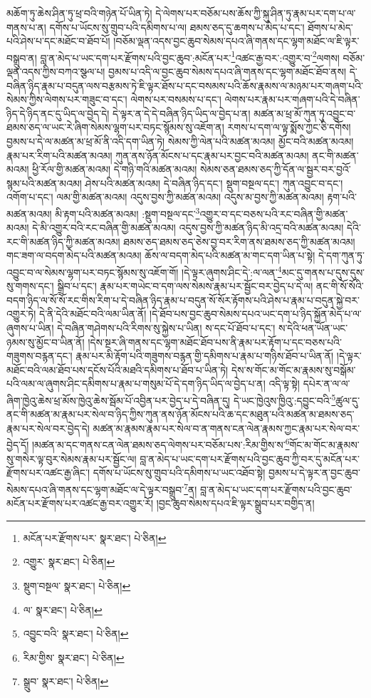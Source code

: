 མཆོག་ཏུ་ཆེས་ཤིན་ཏུ་ཕྲ་བའི་གཉེན་པོ་ཡིན་ཏེ། དེ་ལེགས་པར་བཅོམ་པས་ཆོས་ཀྱི་སྐུ་ཤིན་ཏུ་རྣམ་པར་དག་པ་ལ་གནས་པ་ན། དགོས་པ་ཡོངས་སུ་གྲུབ་པའི་དམིགས་པ་ལ། ཐམས་ཅད་དུ་ཆགས་པ་མེད་པ་དང་། ཐོགས་པ་མེད་པའི་ཤེས་པ་དང་མཐོང་བ་ཐོབ་པོ། །བཅོམ་ལྡན་འདས་བྱང་ཆུབ་སེམས་དཔའ་ཞི་གནས་དང་ལྷག་མཐོང་ལ་ཇི་ལྟར་བསྒྲུབ་ན། བླ་ན་མེད་པ་ཡང་དག་པར་རྫོགས་པའི་བྱང་ཆུབ་:མངོན་པར་\footnote{མངོན་པར་རྫོགས་པར་  སྣར་ཐང་།  པེ་ཅིན། }འཚང་རྒྱ་བར་:འགྱུར་བ་\footnote{འགྱུར་  སྣར་ཐང་།  པེ་ཅིན། }ལགས། བཅོམ་ལྡན་འདས་ཀྱིས་བཀའ་སྩལ་པ། བྱམས་པ་འདི་ལ་བྱང་ཆུབ་སེམས་དཔའ་ཞི་གནས་དང་ལྷག་མཐོང་ཐོབ་ནས། དེ་བཞིན་ཉིད་རྣམ་པ་བདུན་ལས་བརྩམས་ཏེ་ཇི་ལྟར་ཐོས་པ་དང་བསམས་པའི་ཆོས་རྣམས་ལ་མཉམ་པར་གཞག་པའི་སེམས་ཀྱིས་ལེགས་པར་གཟུང་བ་དང་། ལེགས་པར་བསམས་པ་དང་། ལེགས་པར་རྣམ་པར་གཞག་པའི་དེ་བཞིན་ཉིད་དེ་ཉིད་ནང་དུ་ཡིད་ལ་བྱེད་དེ། དེ་ལྟར་ན་དེ་དེ་བཞིན་ཉིད་ཡིད་ལ་བྱེད་པ་ན། མཚན་མ་ཕྲ་མོ་ཀུན་ཏུ་འབྱུང་བ་ཐམས་ཅད་ལ་ཡང་རེ་ཞིག་སེམས་ལྷག་པར་བཏང་སྙོམས་སུ་འཇོག་ན། རགས་པ་དག་ལ་ལྟ་སྨོས་ཀྱང་ཅི་དགོས། བྱམས་པ་དེ་ལ་མཚན་མ་ཕྲ་མོ་ནི་འདི་དག་ཡིན་ཏེ། སེམས་ཀྱི་ལེན་པའི་མཚན་མའམ། མྱོང་བའི་མཚན་མའམ། རྣམ་པར་རིག་པའི་མཚན་མའམ། ཀུན་ནས་ཉོན་མོངས་པ་དང་རྣམ་པར་བྱང་བའི་མཚན་མའམ། ནང་གི་མཚན་མའམ། ཕྱི་རོལ་གྱི་མཚན་མའམ། དེ་གཉི་གའི་མཚན་མའམ། སེམས་ཅན་ཐམས་ཅད་ཀྱི་དོན་ལ་སྦྱར་བར་བྱའོ་སྙམ་པའི་མཚན་མའམ། ཤེས་པའི་མཚན་མའམ། དེ་བཞིན་ཉིད་དང་། སྡུག་བསྔལ་དང་། ཀུན་འབྱུང་བ་དང་། འགོག་པ་དང་། ལམ་གྱི་མཚན་མའམ། འདུས་བྱས་ཀྱི་མཚན་མའམ། འདུས་མ་བྱས་ཀྱི་མཚན་མའམ། རྟག་པའི་མཚན་མའམ། མི་རྟག་པའི་མཚན་མའམ། :སྡུག་བསྔལ་དང་\footnote{སྡུག་བསྔལ་  སྣར་ཐང་།  པེ་ཅིན། }འགྱུར་བ་དང་བཅས་པའི་རང་བཞིན་གྱི་མཚན་མའམ། དེ་མི་འགྱུར་བའི་རང་བཞིན་གྱི་མཚན་མའམ། འདུས་བྱས་ཀྱི་མཚན་ཉིད་མི་འདྲ་བའི་མཚན་མའམ། དེའི་རང་གི་མཚན་ཉིད་ཀྱི་མཚན་མའམ། ཐམས་ཅད་ཐམས་ཅད་ཅེས་བྱ་བར་རིག་ནས་ཐམས་ཅད་ཀྱི་མཚན་མའམ། གང་ཟག་ལ་བདག་མེད་པའི་མཚན་མའམ། ཆོས་ལ་བདག་མེད་པའི་མཚན་མ་གང་དག་ཡིན་པ་སྟེ། དེ་དག་ཀུན་ཏུ་འབྱུང་བ་ལ་སེམས་ལྷག་པར་བཏང་སྙོམས་སུ་འཇོག་གོ། །དེ་ལྟར་ཞུགས་ཤིང་དེ་:ལ་ལན་\footnote{ལ་  སྣར་ཐང་།  པེ་ཅིན། }མང་དུ་གནས་པ་དུས་དུས་སུ་གགས་དང་། སྒྲིབ་པ་དང་། རྣམ་པར་གཡེང་བ་དག་ལས་སེམས་རྣམ་པར་སྦྱོང་བར་བྱེད་པ་དེ་ལ། ནང་གི་སོ་སོའི་བདག་ཉིད་ལ་སོ་སོ་རང་གིས་རིག་པ་དེ་བཞིན་ཉིད་རྣམ་པ་བདུན་སོ་སོར་རྟོགས་པའི་ཤེས་པ་རྣམ་པ་བདུན་སྐྱེ་བར་འགྱུར་ཏེ། དེ་ནི་དེའི་མཐོང་བའི་ལམ་ཡིན་ནོ། །དེ་ཐོབ་པས་བྱང་ཆུབ་སེམས་དཔའ་ཡང་དག་པ་ཉིད་སྐྱོན་མེད་པ་ལ་ཞུགས་པ་ཡིན། དེ་བཞིན་གཤེགས་པའི་རིགས་སུ་སྐྱེས་པ་ཡིན། ས་དང་པོ་ཐོབ་པ་དང་། ས་དེའི་ཕན་ཡོན་ཡང་ཉམས་སུ་མྱོང་བ་ཡིན་ནོ། །དེས་སྔར་ཞི་གནས་དང་ལྷག་མཐོང་ཐོབ་པས་ནི་རྣམ་པར་རྟོག་པ་དང་བཅས་པའི་གཟུགས་བརྙན་དང་། རྣམ་པར་མི་རྟོག་པའི་གཟུགས་བརྙན་གྱི་དམིགས་པ་རྣམ་པ་གཉིས་ཐོབ་པ་ཡིན་ནོ། །དེ་ལྟར་མཐོང་བའི་ལམ་ཐོབ་པས་དངོས་པོའི་མཐའི་དམིགས་པ་ཐོབ་པ་ཡིན་ཏེ། དེས་ས་གོང་མ་གོང་མ་རྣམས་སུ་བསྒོམ་པའི་ལམ་ལ་ཞུགས་ཤིང་དམིགས་པ་རྣམ་པ་གསུམ་པོ་དེ་དག་ཉིད་ཡིད་ལ་བྱེད་པ་ན། འདི་ལྟ་སྟེ། དཔེར་ན་ལ་ལ་ཞིག་ཁྱེའུ་ཆེས་ཕྲ་མོས་ཁྱེའུ་ཆེས་སྦོམ་པོ་འབྱིན་པར་བྱེད་པ་དེ་བཞིན་དུ། དེ་ཡང་ཁྱེའུས་ཁྱིའུ་:དབྱུང་བའི་\footnote{འབྱུང་བའི་  སྣར་ཐང་།  པེ་ཅིན། }ཚུལ་དུ་ནང་གི་མཚན་མ་རྣམ་པར་སེལ་བ་ཉིད་ཀྱིས་ཀུན་ནས་ཉོན་མོངས་པའི་ཆ་དང་མཐུན་པའི་མཚན་མ་ཐམས་ཅད་རྣམ་པར་སེལ་བར་བྱེད་དེ། མཚན་མ་རྣམས་རྣམ་པར་སེལ་བ་ན་གནས་ངན་ལེན་རྣམས་ཀྱང་རྣམ་པར་སེལ་བར་བྱེད་དོ། །མཚན་མ་དང་གནས་ངན་ལེན་ཐམས་ཅད་ལེགས་པར་བཅོམ་པས་:རིམ་གྱིས་ས་\footnote{རིམ་གྱིས་  སྣར་ཐང་།  པེ་ཅིན། }གོང་མ་གོང་མ་རྣམས་སུ་གསེར་ལྟ་བུར་སེམས་རྣམ་པར་སྦྱོང་ལ། བླ་ན་མེད་པ་ཡང་དག་པར་རྫོགས་པའི་བྱང་ཆུབ་ཀྱི་བར་དུ་མངོན་པར་རྫོགས་པར་འཚང་རྒྱ་ཞིང་། དགོས་པ་ཡོངས་སུ་གྲུབ་པའི་དམིགས་པ་ཡང་འཐོབ་སྟེ། བྱམས་པ་དེ་ལྟར་ན་བྱང་ཆུབ་སེམས་དཔའ་ཞི་གནས་དང་ལྷག་མཐོང་ལ་དེ་ལྟར་བསྒྲུབ་\footnote{སྒྲུབ་  སྣར་ཐང་།  པེ་ཅིན། }ན། བླ་ན་མེད་པ་ཡང་དག་པར་རྫོགས་པའི་བྱང་ཆུབ་མངོན་པར་རྫོགས་པར་འཚང་རྒྱ་བར་འགྱུར་རོ། །བྱང་ཆུབ་སེམས་དཔའ་ཇི་ལྟར་སྒྲུབ་པར་བགྱིད་ན། 